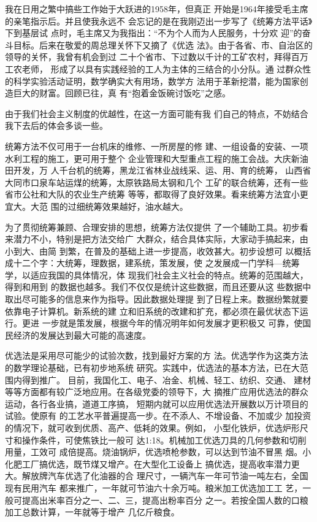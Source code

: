 \documentclass[twoside,openright,headings=optiontohead]{ctexbook} %
\begin{document}
{我在日用之繁中搞些工作始于大跃进的1958年，但真正
开始是1964年接受毛主席的亲笔指示后。并且使我永远不
会忘记的是在我刚迈出一步写了《统筹方法平话》下到基层试
点时，毛主席又为我指出：``不为个人而为人民服务，十分欢
迎''的奋斗目标。后来在敬爱的周总理关怀下又摘了《优选
法》。由于各省、市、自治区的领导的关怀，我曾有机会到过
二十个省市、下过数以千计的工矿农村，拜得百万工农老师，
形成了以具有实践经验的工人为主体的三结合的小分队。通
过群众性的科学实验活动证明，数学确实大有用场，数学方
法用于革新挖潜，能为国家创造巨大的财富。回顾已往，真
有``抱着金饭碗讨饭吃''之感。

由于我们社会主义制度的优越性，在这一方面可能有我
们自己的特点，不妨结合我下去后的体会多谈一些。

统筹方法不仅可用于一台机床的维修、一所房屋的修
建、一组设备的安装、一项水利工程的施工，更可用于整个
企业管理和大型重点工程的施工会战。大庆新油田开发，万
人千台机的统筹，黑龙江省林业战线采、运、用、育的统筹，
山西省大同市口泉车站运煤的统筹，太原铁路局太钢和几个
工矿的联合统筹，还有一些省市公社和大队的农业生产统筹
等等，都取得了良好效果。看来统筹方法宜小更宜大。大范
围的过细统筹效果越好，油水越大。

为了贯彻统筹兼顾、合理安排的思想，统筹方法仅提供
了一个辅助工具。初步看来潜力不小，特别是把方法交给广
大群众，结合具体实际，大家动手搞起来，由小到大、由简
到繁，在普及的基础上进一步提高，收效甚大。初步设想可
以概括成十二个字：大统筹，理数据，建系统，策发展，使
之发展成一门学科---统筹学，以适应我国的具体情况，体
现我们社会主义社会的特点。统筹的范围越大，得到和用到
的数据也越多。我们不仅仅是统计这些数据，而且还要从这
些数据中取出尽可能多的信息来作为指导。因此数据处理提
到了日程上来。数据纷繁就要依靠电子计算机。新系统的建
立和旧系统的改建和扩充，都必须在最优状态下运行。更进
一步就是策发展，根据今年的情况明年如何发展才更积极又
可靠，使国民经济的发展达到最大可能的高速度。

优选法是采用尽可能少的试验次数，找到最好方案的方
法。优选学作为这类方法的数学理论基础，已有初步地系统
研究。实践中，优选法的基本方法，已在大范围内得到推广。
目前，我国化工、电子、冶金、机械、轻工、纺织、交通、
建材等等方面都有较广泛地应用。在各级党委的领导下，大
摘推广应用优选法的群众运动，各行各业搞，道道工序搞，
短期内就可以应用优选法开展数以万计项目的试验。使原有
的工艺水平普遍提高一步。在不添人、不增设备、不加或少
加投资的情况下，就可收到优质、高产、低耗的效果。例如，
小型化铁炉，优选炉形尺寸和操作条件，可使焦铁比一般可
达1:18。机械加工优选刀具的几何参数和切削用量，工效可
成倍提高。烧油锅炉，优选喷枪参数，可以达到节油不冒黑
烟。小化肥工厂搞优选，既节煤又增产。在大型化工设备上
搞优选，提高收率潜力更大。解放牌汽车优选了化油器的合
理尺寸，一辆汽车一年可节油一吨左右，全国现有民用汽车
都来推广，一年就可节油六十余万吨。粮米加工优选加工工
艺，一般可提高出米率百分之一、二、三，提高出粉率百分
之一。若按全国人数的口粮加工总数计算，一年就等于增产 几亿斤粮食。

}
\end{document}
